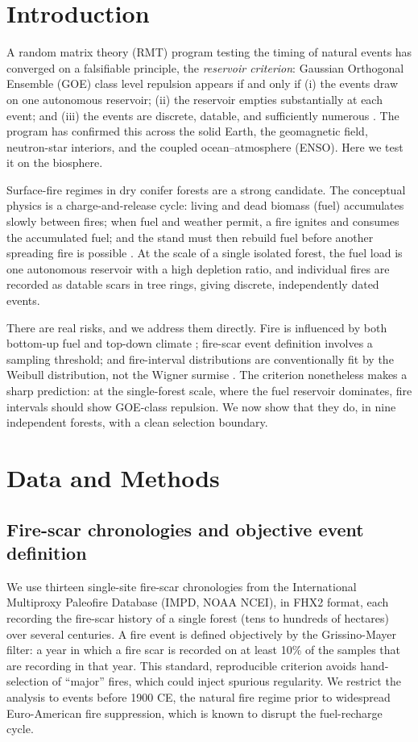 \documentclass[12pt,a4paper]{article}
\begin{document}
\section{Introduction}
A random matrix theory (RMT) program testing the timing of natural events has converged on a falsifiable principle, the \emph{reservoir criterion}: Gaussian Orthogonal Ensemble (GOE) class level repulsion appears if and only if (i) the events draw on one autonomous reservoir; (ii) the reservoir empties substantially at each event; and (iii) the events are discrete, datable, and sufficiently numerous \citep{chen2026plumes,chen2026pulsar,chen2026enso}. The program has confirmed this across the solid Earth, the geomagnetic field, neutron-star interiors, and the coupled ocean--atmosphere (ENSO). Here we test it on the biosphere.

Surface-fire regimes in dry conifer forests are a strong candidate. The conceptual physics is a charge-and-release cycle: living and dead biomass (fuel) accumulates slowly between fires; when fuel and weather permit, a fire ignites and consumes the accumulated fuel; and the stand must then rebuild fuel before another spreading fire is possible \citep{heyerdahl2001,swetnam1993}. At the scale of a single isolated forest, the fuel load is one autonomous reservoir with a high depletion ratio, and individual fires are recorded as datable scars in tree rings, giving discrete, independently dated events.

There are real risks, and we address them directly. Fire is influenced by both bottom-up fuel and top-down climate \citep{falk2011}; fire-scar event definition involves a sampling threshold; and fire-interval distributions are conventionally fit by the Weibull distribution, not the Wigner surmise \citep{grissino1999}. The criterion nonetheless makes a sharp prediction: at the single-forest scale, where the fuel reservoir dominates, fire intervals should show GOE-class repulsion. We now show that they do, in nine independent forests, with a clean selection boundary.

\section{Data and Methods}
\subsection{Fire-scar chronologies and objective event definition}
We use thirteen single-site fire-scar chronologies from the International Multiproxy Paleofire Database (IMPD, NOAA NCEI), in FHX2 format, each recording the fire-scar history of a single forest (tens to hundreds of hectares) over several centuries. A fire event is defined objectively by the Grissino-Mayer filter: a year in which a fire scar is recorded on at least 10\% of the samples that are recording in that year. This standard, reproducible criterion avoids hand-selection of ``major'' fires, which could inject spurious regularity. We restrict the analysis to events before 1900 CE, the natural fire regime prior to widespread Euro-American fire suppression, which is known to disrupt the fuel-recharge cycle.
\end{document}
